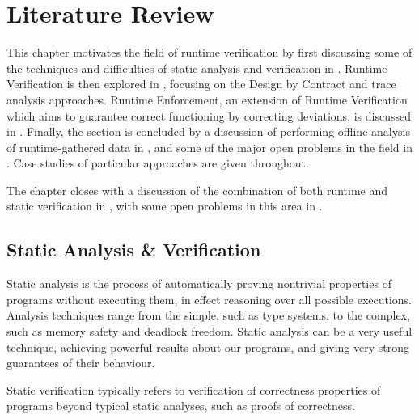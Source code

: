 \chapter{Literature Review}
\label{sec:litrev}


This chapter motivates the field of runtime verification by first
discussing some of the techniques and difficulties of static analysis
and verification in . Runtime Verification is then
explored in , focusing on the Design by Contract and
trace analysis approaches. Runtime Enforcement, an extension of
Runtime Verification which aims to guarantee correct functioning by
correcting deviations, is discussed in
. Finally, the section is concluded by a
discussion of performing offline analysis of runtime-gathered data in
, and some of the major open problems in the
field in . Case studies of particular
approaches are given throughout.

The chapter closes with a discussion of the combination of both
runtime and static verification in , with some open
problems in this area in .

\section{Static Analysis \& Verification}
\label{sec:litrev-stat}

Static analysis is the process of automatically proving nontrivial
properties of programs without executing them\cite{secure}, in effect
reasoning over all possible executions. Analysis techniques range from
the simple, such as type systems\cite{types}, to the complex, such as
memory safety\cite{infer} and deadlock freedom\cite{racerx}. Static
analysis can be a very useful technique, achieving powerful results
about our programs, and giving very strong guarantees of their
behaviour.

Static verification typically refers to verification of correctness
properties of programs beyond typical static analyses, such as proofs
of correctness.

